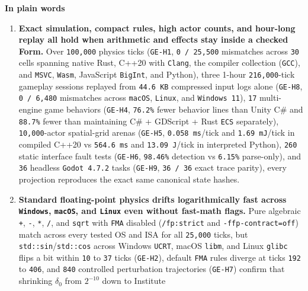 \documentclass[10pt,letterpaper]{article}
\providecommand{\tightlist}{\setlength{\itemsep}{1pt}\setlength{\parskip}{0pt}}
\begin{document}
\textbf{In plain words}

\begin{enumerate}
\def\labelenumi{\arabic{enumi}.}
\tightlist
\item
  \textbf{Exact simulation, compact rules, high actor counts, and
  hour-long replay all hold when arithmetic and effects stay inside a
  checked Form.} Over \texttt{100,000} physics ticks (\texttt{GE-H1},
  \texttt{0\ /\allowbreak{}\ 25,\allowbreak{}500} mismatches across \texttt{30} cells spanning
  native Rust, C++20 with \texttt{Clang}, the compiler collection
  (\texttt{GCC}), and \texttt{MSVC}, \texttt{Wasm}, JavaScript
  \texttt{BigInt}, and Python), three 1-hour \texttt{216,000}-tick
  gameplay sessions replayed from \texttt{44.6\ KB} compressed input
  logs alone (\texttt{GE-H8}, \texttt{0\ /\allowbreak{}\ 6,\allowbreak{}480} mismatches across
  \texttt{macOS}, \texttt{Linux}, and \texttt{Windows\ 11}), \texttt{17}
  multi-engine game behaviors (\texttt{GE-H4}, \texttt{76.2\%} fewer
  behavior lines than Unity C\# and \texttt{88.7\%} fewer than
  maintaining C\# + GDScript + Rust \texttt{ECS} separately),
  \texttt{10,000}-actor spatial-grid arenas (\texttt{GE-H5},
  \texttt{0.058\ ms}/\allowbreak{}tick and \texttt{1.69\ mJ}/\allowbreak{}tick in compiled C++20
  vs \texttt{564.6\ ms} and \texttt{13.09\ J}/\allowbreak{}tick in interpreted
  Python), \texttt{260} static interface fault tests (\texttt{GE-H6},
  \texttt{98.46\%} detection vs \texttt{6.15\%} parse-only), and
  \texttt{36} headless \texttt{Godot\ 4.\allowbreak{}7.\allowbreak{}2} tasks (\texttt{GE-H9},
  \texttt{36\ /\ 36} exact trace parity), every projection reproduces
  the exact same canonical state hashes.
\item
  \textbf{Standard floating-point physics drifts logarithmically fast
  across \texttt{Windows}, \texttt{macOS}, and \texttt{Linux} even
  without fast-math flags.} Pure algebraic \texttt{+}, \texttt{-},
  \texttt{*}, \texttt{/}, and \texttt{sqrt} with \texttt{FMA} disabled
  (\texttt{/\allowbreak{}fp:strict} and \texttt{-\allowbreak{}ffp-\allowbreak{}contract=off}) match across
  every tested OS and ISA for all \texttt{25,000} ticks, but
  \texttt{std::sin}/\allowbreak{}\texttt{std::cos} across Windows \texttt{UCRT},
  macOS \texttt{libm}, and Linux \texttt{glibc} flips a bit within
  \texttt{10} to \texttt{37} ticks (\texttt{GE-H2}), default
  \texttt{FMA} rules diverge at ticks \texttt{192} to \texttt{406}, and
  \texttt{840} controlled perturbation trajectories (\texttt{GE-H7})
  confirm that shrinking \(\delta_0\) from \(2^{-10}\) down to Institute

\end{enumerate}
\end{document}
